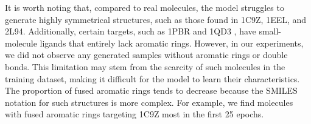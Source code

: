 \documentclass[10pt, twocolumn]{article}
\begin{document}
It is worth noting that, compared to real molecules, the model struggles to generate highly symmetrical structures, such as those found in 1C9Z, 1EEL, and 2L94. Additionally, certain targets, such as 1PBR \cite{Fourmy1996} and 1QD3 \cite{Faber2000}, have small-molecule ligands that entirely lack aromatic rings. However, in our experiments, we did not observe any generated samples without aromatic rings or double bonds. This limitation may stem from the scarcity of such molecules in the training dataset, making it difficult for the model to learn their characteristics. The proportion of fused aromatic rings tends to decrease because the SMILES notation for such structures is more complex. For example, we find molecules with fused aromatic rings targeting 1C9Z most in the first 25 epochs.

\end{document}
